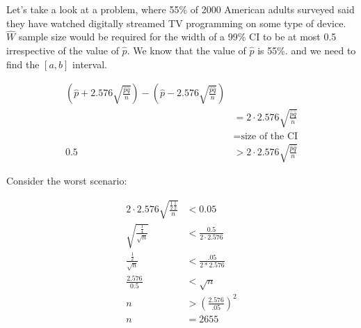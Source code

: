 	\begin{problem}
		Let's take a look at a problem, where 55\% of 2000 American adults surveyed said they have watched digitally streamed TV programming on some type of device. $\hat{W}$ sample size would be required for the width of a 99\% CI to be at most 0.5 irrespective of the value of $\hat{p}$. We know that the value of $\hat{p}$ is 55\%. and we need to find the $[a,b]$ interval.

		$$
		\begin{aligned}
			\left(\hat{p}+2.576\sqrt{\frac{\hat{p}\hat{q}}{n}}\right)-\left(\hat{p}-2.576\sqrt{\frac{\hat{p}\hat{q}}{n}}\right)\\
			&=2\cdot 2.576\sqrt{\frac{\hat{p}\hat{q}}{n}}\\
			&= \text{size of the CI}\\
			0.5 &> 2\cdot 2.576\sqrt{\frac{\hat{p}\hat{q}}{n}}
		\end{aligned}
		$$

		Consider the worst scenario:

		$$
		\begin{aligned}
			2\cdot 2.576\sqrt{\frac{\frac{1}{2}\frac{1}{2}}{n}}&<0.05\\
			\sqrt{\frac{\frac{1}{4}}{\sqrt{n}}}&<\frac{0.5}{2\cdot2.576}\\
			\frac{\frac{1}{2}}{\sqrt{n}}&<\frac{.05}{2*2.576}\\
			\frac{2.576}{0.5}&<\sqrt{n}\\
			n&>\left(\frac{2.576}{.05}\right)^2\\
			n&=2655
		\end{aligned}
		$$
		\end{problem}

